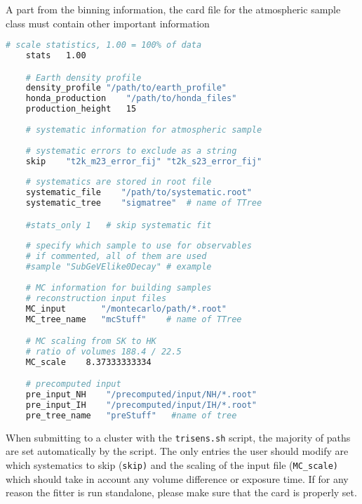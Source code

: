 \documentclass[a4paper, 11pt]{article}
\begin{document}
A part from the binning information, the card file for the atmospheric sample class must contain other important information
\begin{lstlisting}[language=bash]
    # scale statistics, 1.00 = 100% of data
    stats	1.00

    # Earth density profile
    density_profile	"/path/to/earth_profile"
    honda_production	"/path/to/honda_files"
    production_height	15
    
    # systematic information for atmospheric sample
    
    # systematic errors to exclude as a string
    skip	"t2k_m23_error_fij" "t2k_s23_error_fij"
    
    # systematics are stored in root file
    systematic_file    "/path/to/systematic.root"
    systematic_tree    "sigmatree"	# name of TTree

    #stats_only	1	# skip systematic fit
    
    # specify which sample to use for observables
    # if commented, all of them are used
    #sample	"SubGeVElike0Decay"	# example
    
    # MC information for building samples
    # reconstruction input files
    MC_input	   "/montecarlo/path/*.root"
    MC_tree_name   "mcStuff"	# name of TTree

    # MC scaling from SK to HK
    # ratio of volumes 188.4 / 22.5
    MC_scale	8.37333333334

    # precomputed input
    pre_input_NH	"/precomputed/input/NH/*.root"
    pre_input_IH	"/precomputed/input/IH/*.root"
    pre_tree_name	"preStuff"   #name of tree
\end{lstlisting}
When submitting to a cluster with the \texttt{trisens.sh} script, %
the majority of paths are set automatically by the script.
The only entries the user should modify are which systematics to skip (\texttt{skip)} %
and the scaling of the input file (\texttt{MC\_scale)} which should take in account any %
volume difference or exposure time.
If for any reason the fitter is run standalone, please make sure that the card is properly set.
\end{document}
